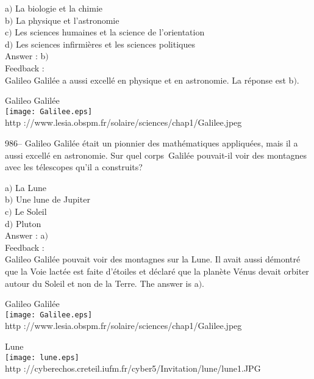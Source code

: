 ﻿\documentclass[letterpaper, 12pt]{article}
\begin{document}
a$)$ La biologie et la chimie \\
b$)$ La physique et l'astronomie \\
c$)$ Les sciences humaines et la science de l'orientation \\
d$)$ Les sciences infirmi\`eres et les sciences politiques\\

Answer : b$)$\\

Feedback : \\
Galileo Galil\'ee a aussi excell\'e en physique et en astronomie. La
r\'eponse est b$)$.

        \begin{center}
        Galileo Galil\'ee\\
    \texttt{[image: Galilee.eps]}\\
        {\footnotesize http
://www.lesia.obspm.fr/solaire/sciences/chap1/Galilee.jpeg}
    \end{center}

986-- Galileo Galil\'ee \'etait un pionnier des math\'ematiques
appliqu\'ees, mais il a aussi excell\'e en astronomie. Sur quel \og
corps\fg\ Galil\'ee pouvait-il voir des montagnes avec les
t\'elescopes qu'il a construits?

a$)$ La Lune \\
b$)$ Une lune de Jupiter \\
c$)$ Le Soleil \\
d$)$ Pluton\\

Answer : a$)$\\

Feedback : \\
Galileo Galil\'ee pouvait voir des montagnes sur la Lune. Il avait
aussi d\'emontr\'e que la Voie lact\'ee est faite d'\'etoiles et
d\'eclar\'e que la plan\`ete V\'enus devait orbiter autour du Soleil
et non de la Terre.
The answer is a$)$.\\

        \begin{center}
        Galileo Galil\'ee\\
    \texttt{[image: Galilee.eps]}\\
        {\footnotesize http
://www.lesia.obspm.fr/solaire/sciences/chap1/Galilee.jpeg}
    \end{center}

        \begin{center}
        Lune\\
    \texttt{[image: lune.eps]}\\
        {\footnotesize http
://cyberechos.creteil.iufm.fr/cyber5/Invitation/lune/lune1.JPG}
    \end{center}
\end{document}
